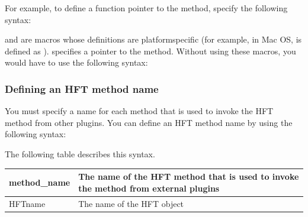 \documentclass[letterpaper,12pt,english,openany,oneside]{sphinxmanual}
\begin{document}
For example, to define a function pointer to the  method, specify the following syntax:

\begin{sphinxVerbatim}[commandchars=\\\{\}]
     
\end{sphinxVerbatim}

 and  are macros whose definitions are platform\sphinxhyphen{}specific (for example, in Mac OS,  is defined as  ).  specifies a pointer to the  method. Without using these macros, you would have to use the following syntax:

\begin{sphinxVerbatim}[commandchars=\\\{\}]
   
\end{sphinxVerbatim}


\subsubsection{Defining an HFT method name}
\label{\detokenize{Plugins_Hft:defining-an-hft-method-name}}
You must specify a name for each method that is used to invoke the HFT method from other plugins. You can define an HFT method name by using the following syntax:

\begin{sphinxVerbatim}[commandchars=\\\{\}]
\end{sphinxVerbatim}

The following table describes this syntax.


\begin{savenotes}\sphinxattablestart
\centering
{}\label{\detokenize{Plugins_Hft:section-1}}\nobreak
\begin{tabulary}{\linewidth}[t]{|T|T|}
\hline

method\_name
&
The name of the HFT method that is used to invoke the method from external plugins
\\
\hline
HFTname
&
The name of the HFT object
\\
\hline
\end{tabulary}
\par
\sphinxattableend\end{savenotes}
\end{document}
